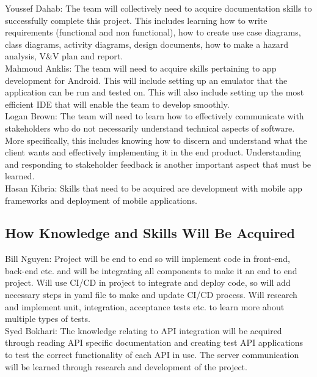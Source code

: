 \documentclass[12pt,letterpaper]{article}
\begin{document}
\noindent Youssef Dahab: The team will collectively need to acquire documentation skills to successfully complete this project. This includes learning how to write requirements (functional and non functional), how to create use case diagrams, class diagrams, activity diagrams, design documents, how to make a hazard analysis, V\&V plan and report.\\

\noindent Mahmoud Anklis: The team will need to acquire skills pertaining to app development for Android. This will include setting up an emulator that the application can be run and tested on. This will also include setting up the most efficient IDE that will enable the team to develop smoothly.\\ 

\noindent Logan Brown: The team will need to learn how to effectively communicate with stakeholders who do not necessarily understand technical aspects of software. More specifically, this includes knowing how to discern and understand what the client wants and effectively implementing it in the end product. Understanding and responding to stakeholder feedback is another important aspect that must be learned.\\

\noindent Hasan Kibria: Skills that need to be acquired are development with mobile app frameworks and deployment of mobile applications.\\

\subsection{How Knowledge and Skills Will Be Acquired}

\noindent Bill Nguyen: Project will be end to end so will implement code in front-end, back-end etc. and will be integrating all components to make it an end to end project. Will use CI/CD in project to integrate and deploy code, so will add necessary steps in yaml file to make and update CI/CD process. Will research and implement unit, integration, acceptance tests etc. to learn more about multiple types of tests. \\

\noindent Syed Bokhari: The knowledge relating to API integration will be acquired through reading API specific documentation and creating test API applications to test the correct functionality of each API in use. The server communication will be learned through research and development of the project.\\
\end{document}
